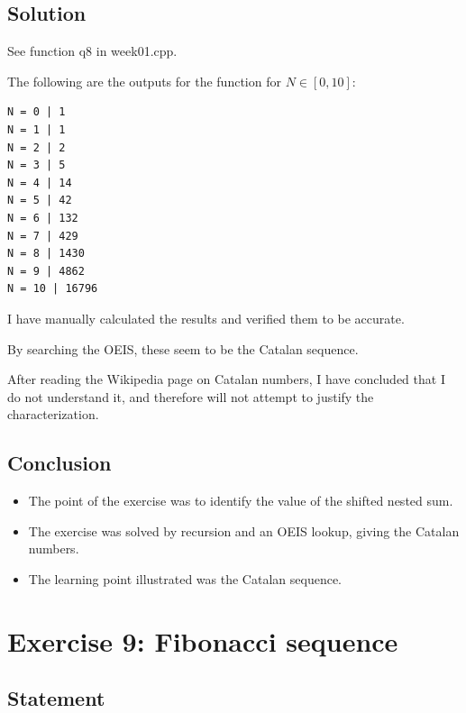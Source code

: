 \documentclass[12pt]{article}
\begin{document}

\subsection{Solution}

See function q8 in week01.cpp.

The following are the outputs for the function for $N \in [0,10]$:

\begin{verbatim}
N = 0 | 1
N = 1 | 1
N = 2 | 2
N = 3 | 5
N = 4 | 14
N = 5 | 42
N = 6 | 132
N = 7 | 429
N = 8 | 1430
N = 9 | 4862
N = 10 | 16796
\end{verbatim}

I have manually calculated the results and verified them to be accurate.

By searching the OEIS, these seem to be the Catalan sequence.

After reading the Wikipedia page on Catalan numbers, I have concluded that I do
not understand it, and therefore will not attempt to justify the
characterization.


\subsection{Conclusion}

\begin{itemize}

\item
  The point of the exercise was to identify the value of the shifted nested sum.

\item
  The exercise was solved by recursion and an OEIS lookup, giving the Catalan numbers.

\item
  The learning point illustrated was the Catalan sequence.

\end{itemize}


\newpage

\section{Exercise 9: Fibonacci sequence}


\subsection{Statement}
\end{document}
